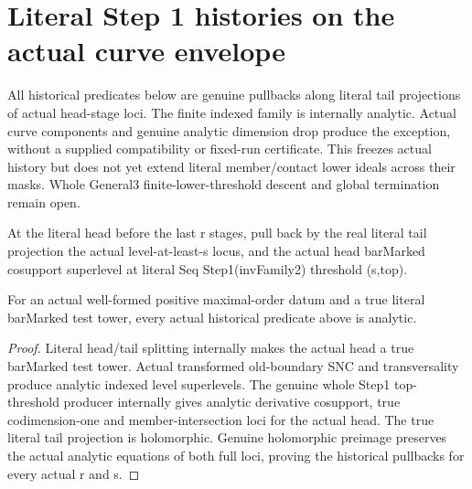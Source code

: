 \section{Literal Step 1 histories on the actual curve envelope}

All historical predicates below are genuine pullbacks along literal tail
projections of actual head-stage loci. The finite indexed family is internally
analytic. Actual curve components and genuine analytic dimension drop produce
the exception, without a supplied compatibility or fixed-run certificate.
This freezes actual history but does not yet extend literal member/contact
lower ideals across their masks. Whole General3 finite-lower-threshold descent
and global termination remain open.

\begin{definition}
\label{hir:step-one-actual-curve-head-history-predicates}
\leanok
At the literal head before the last r stages, pull back by the real literal tail
projection the actual level-at-least-s locus, and the actual head barMarked
cosupport superlevel at literal Seq Step1(invFamily2) threshold (s,top).
\end{definition}

\begin{lemma}
\label{hir:step-one-actual-curve-head-history-analytic}
\leanok
For an actual well-formed positive maximal-order datum and a true literal
barMarked test tower, every actual historical predicate above is analytic.
\end{lemma}
\begin{proof}
Literal head/tail splitting internally makes the actual head a true barMarked
test tower. Actual transformed old-boundary SNC and transversality produce
analytic indexed level superlevels. The genuine whole Step1 top-threshold
producer internally gives analytic derivative cosupport, true codimension-one
and member-intersection loci for the actual head. The true literal tail
projection is holomorphic. Genuine holomorphic preimage preserves the actual
analytic equations of both full loci, proving the historical pullbacks for
every actual r and s.
\end{proof}

